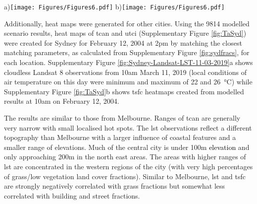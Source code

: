 \documentclass[final,3p,times,authoryear]{elsarticle}
\newcommand{\add}[1]{\textcolor{black}{#1}}
\newcommand{\remove}[1]{\textcolor{red}{\st{}}}
\begin{document}
\begin{figure*}
\centering
a)\texttt{[image: Figures/Figures6.pdf]}
b)\texttt{[image: Figures/Figures6.pdf]}
\caption{\bf a) Landsat 8 land surface temperature (\SI{}{\degreeCelsius}) captured 10am December 11, 2018. Local conditions of air temperature on this day were minimum and maximum of 22 and 26\SI{}{\degreeCelsius}. b) Modelled \gls{tsfc} (\SI{}{\degreeCelsius}) on February 12, 2004 at 10am generated by matching the closest matching parameters of surface fractions and average heights for each 100$\times$100m location in Melbourne from 9814 modelled scenario results.}
 \label{fig:Melb_TSFC12_85}
\end{figure*}


Additionally, heat maps were generated for other cities. Using the 9814 modelled scenario results, heat maps of \gls{tcan} and \gls{utci} (Supplementary Figure \ref{fig:TaSyd}) were created for Sydney for February 12, 2004 at 2pm by matching the closest matching parameters, as calculated from Supplementary Figure \ref{fig:sydfracs}, for each location. Supplementary Figure \ref{fig:Sydney-Landsat-LST-11-03-2019}a shows cloudless Landsat 8 observations from 10am March 11, 2019 (local conditions of air temperature on this day were minimum and maximum of 22 and 26\SI{}{\degreeCelsius}) while Supplementary Figure \ref{fig:TaSyd}b shows \gls{tsfc} heatmaps created from modelled results at 10am on February 12, 2004. 

The results are similar to those from Melbourne. Ranges of \gls{tcan} are generally very narrow with small localised hot spots. The \gls{lst} observations reflect a different topography than Melbourne with a larger influence of coastal features and a smaller range of elevations. Much of the central city is under 100m \add{elevation} and only approaching 200m in the north east areas. The areas with higher ranges of \gls{lst} are concentrated in the \remove{agricultural}western regions of the city (with very high percentages of grass/low vegetation land cover fractions). Similar to Melbourne, \remove{correlations between differences between}\gls{lst} and \gls{tsfc} are strongly negatively correlated with grass fractions but somewhat less correlated with building and street fractions.
\end{document}
